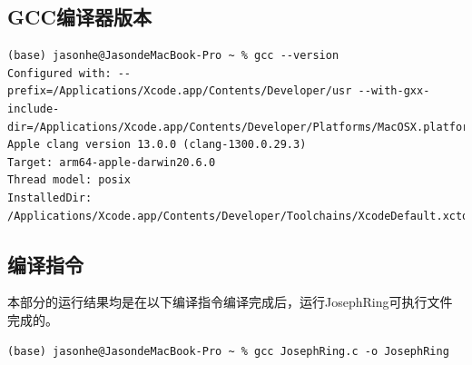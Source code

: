 \documentclass[a4paper,12pt]{report}
\begin{document}
\subsection{GCC编译器版本}
\begin{lstlisting}
(base) jasonhe@JasondeMacBook-Pro ~ % gcc --version
Configured with: --prefix=/Applications/Xcode.app/Contents/Developer/usr --with-gxx-include-dir=/Applications/Xcode.app/Contents/Developer/Platforms/MacOSX.platform/Developer/SDKs/MacOSX.sdk/usr/include/c++/4.2.1
Apple clang version 13.0.0 (clang-1300.0.29.3)
Target: arm64-apple-darwin20.6.0
Thread model: posix
InstalledDir: /Applications/Xcode.app/Contents/Developer/Toolchains/XcodeDefault.xctoolchain/usr/bin
\end{lstlisting}
\subsection{编译指令}
本部分的运行结果均是在以下编译指令编译完成后，运行JosephRing可执行文件完成的。
\begin{lstlisting}
(base) jasonhe@JasondeMacBook-Pro ~ % gcc JosephRing.c -o JosephRing
\end{lstlisting}




\end{document}
